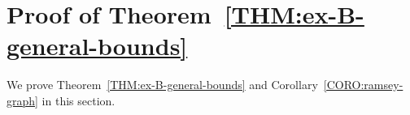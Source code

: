 \documentclass[11pt,a4paper]{article}
\newtheorem{theorem}[definition]{Theorem}
\newtheorem{corollary}[definition]{Corollary}
\newcommand{\graph}{H}
\begin{document}




\section{Proof of Theorem~\ref{THM:ex-B-general-bounds}}\label{SEC:Proof}
%
We prove Theorem~\ref{THM:ex-B-general-bounds} and Corollary~\ref{CORO:ramsey-graph} in this section. 
\end{document}
